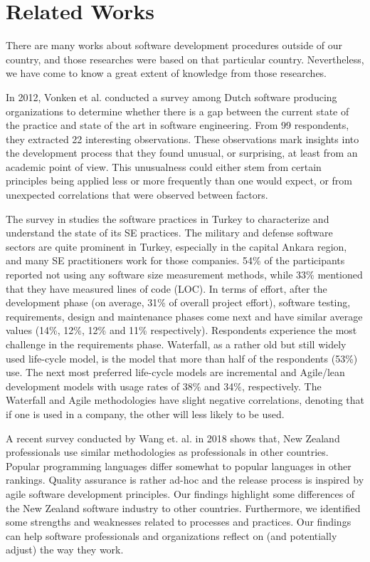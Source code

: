 \section{Related Works}

There are many works about software development procedures outside of our country, and those researches were based on that particular country. Nevertheless, we have come to know a great extent of knowledge from those researches.

In 2012, Vonken et al. \cite{Vonken2012} conducted a survey among Dutch software producing organizations to determine whether there is a gap between the current state of the practice and state of the art in software engineering. From 99 respondents, they extracted 22 interesting observations. These observations mark insights into the development process that they found unusual, or surprising, at least from an academic point of view. This unusualness could either stem from certain principles being applied less or more frequently than one would expect, or from unexpected correlations that were observed between factors.

The survey in \cite{Garousi2015} studies the software practices in Turkey to characterize and understand the state of its SE practices. The military and defense software sectors are quite prominent in Turkey, especially in the capital Ankara region, and many SE practitioners work for those companies. 54\% of the participants reported not using any software size measurement methods, while 33\% mentioned that they have measured lines of code (LOC). In terms of effort, after the development phase (on average, 31\% of overall project effort), software testing, requirements, design and maintenance phases come next and have similar average values (14\%, 12\%, 12\% and 11\% respectively). Respondents experience the most challenge in the requirements phase. Waterfall, as a rather old but still widely used life-cycle model, is the model that more than half of the respondents (53\%) use. The next most preferred life-cycle models are incremental and Agile/lean development models with usage rates of 38\% and 34\%, respectively. The Waterfall and Agile methodologies have slight negative correlations, denoting that if one is used in a company, the other will less likely to be used.

A recent survey conducted by Wang et. al. \cite{Wang2018} in 2018 shows that, New Zealand professionals use similar methodologies as professionals in other countries. Popular programming languages differ somewhat to popular languages in other rankings. Quality assurance is rather ad-hoc and the release process is inspired by agile software development principles. Our findings highlight some differences of the New Zealand software industry to other countries. Furthermore, we identified some strengths and weaknesses related to processes and practices. Our findings can help software professionals and organizations reflect on (and potentially adjust) the way they work.


